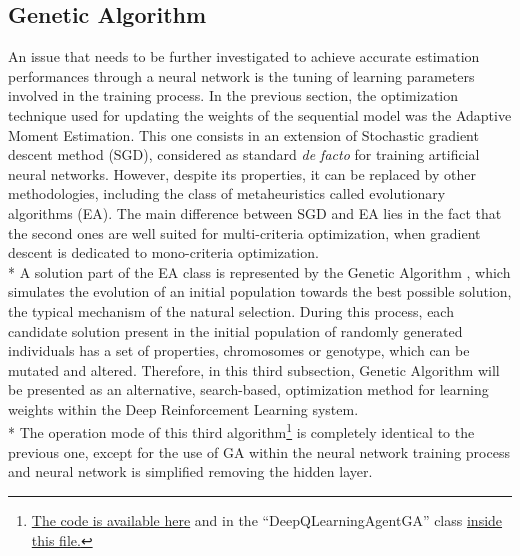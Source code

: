 \subsection{Genetic Algorithm}

An issue that needs to be further investigated to achieve accurate estimation performances through a neural network is the tuning of learning parameters involved in the training process. In the previous section, the optimization technique used for updating the weights of the sequential model was the Adaptive Moment Estimation. This one consists in an extension of Stochastic gradient descent method (SGD), considered as standard \textit{de facto} for training artificial neural networks. However, despite its properties, it can be replaced by other methodologies, including the class of metaheuristics called evolutionary algorithms (EA). The main difference between SGD and EA lies in the fact that the second ones are well suited for multi-criteria optimization, when gradient descent is dedicated to mono-criteria optimization.\\*
A solution part of the EA class is represented by the Genetic Algorithm \cite{7}, which simulates the evolution of an initial population towards the best possible solution, the typical mechanism of the natural selection. During this process, each candidate solution present in the initial population of randomly generated individuals has a set of properties, chromosomes or genotype, which can be mutated and altered. 
Therefore, in this third subsection, Genetic Algorithm will be presented as an alternative, search-based, optimization method for learning weights within the Deep Reinforcement Learning system.\\*
The operation mode of this third algorithm\footnote{\href{https://github.com/moiraghif/DragonHunting/blob/master/Bilbo\%20World/Bilbo_ga_deep_feels.py}{The code is available here} and in the ``DeepQLearningAgentGA'' class \href{https://github.com/moiraghif/DragonHunting/blob/master/Bilbo\%20World/agents.py}{inside this file.}} is completely identical to the previous one, except for the use of GA within the neural network training process and  neural network is simplified removing the hidden layer. 
